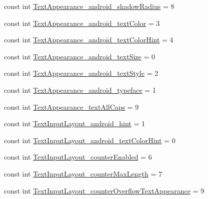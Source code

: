 \begin{DoxyCompactItemize}
\item 
const int \mbox{\hyperlink{class_f_w_p_s___app_1_1_droid_1_1_resource_1_1_styleable_a6eca0cdcb2ebbda7ddcb47d769a078ae}{Text\+Appearance\+\_\+android\+\_\+shadow\+Radius}} = 8
\item 
const int \mbox{\hyperlink{class_f_w_p_s___app_1_1_droid_1_1_resource_1_1_styleable_affa6110a89f22db25450a33b43e449c5}{Text\+Appearance\+\_\+android\+\_\+text\+Color}} = 3
\item 
const int \mbox{\hyperlink{class_f_w_p_s___app_1_1_droid_1_1_resource_1_1_styleable_a455c2774be201649151135eaf57e6512}{Text\+Appearance\+\_\+android\+\_\+text\+Color\+Hint}} = 4
\item 
const int \mbox{\hyperlink{class_f_w_p_s___app_1_1_droid_1_1_resource_1_1_styleable_a661917c7b891af0339e4fd7a79ac2b54}{Text\+Appearance\+\_\+android\+\_\+text\+Size}} = 0
\item 
const int \mbox{\hyperlink{class_f_w_p_s___app_1_1_droid_1_1_resource_1_1_styleable_a38d1187b68e0a8e31b5b86de4b38795e}{Text\+Appearance\+\_\+android\+\_\+text\+Style}} = 2
\item 
const int \mbox{\hyperlink{class_f_w_p_s___app_1_1_droid_1_1_resource_1_1_styleable_abc6de3605efd88c1e7126aa93b071d01}{Text\+Appearance\+\_\+android\+\_\+typeface}} = 1
\item 
const int \mbox{\hyperlink{class_f_w_p_s___app_1_1_droid_1_1_resource_1_1_styleable_a51be362d425b1ee66305776ade8edbcf}{Text\+Appearance\+\_\+text\+All\+Caps}} = 9
\item 
const int \mbox{\hyperlink{class_f_w_p_s___app_1_1_droid_1_1_resource_1_1_styleable_a9300e1f8bb3e1bc7079c9b9ad20a0b3a}{Text\+Input\+Layout\+\_\+android\+\_\+hint}} = 1
\item 
const int \mbox{\hyperlink{class_f_w_p_s___app_1_1_droid_1_1_resource_1_1_styleable_a0685c38c6a7027f29548b5302b61a371}{Text\+Input\+Layout\+\_\+android\+\_\+text\+Color\+Hint}} = 0
\item 
const int \mbox{\hyperlink{class_f_w_p_s___app_1_1_droid_1_1_resource_1_1_styleable_acddae507c611dd5cce1407e32bf3ccfa}{Text\+Input\+Layout\+\_\+counter\+Enabled}} = 6
\item 
const int \mbox{\hyperlink{class_f_w_p_s___app_1_1_droid_1_1_resource_1_1_styleable_aee954575a91728f5a5b01c589cea6974}{Text\+Input\+Layout\+\_\+counter\+Max\+Length}} = 7
\item 
const int \mbox{\hyperlink{class_f_w_p_s___app_1_1_droid_1_1_resource_1_1_styleable_aaab45eaab0c9eb5a0f055a8f81714dbe}{Text\+Input\+Layout\+\_\+counter\+Overflow\+Text\+Appearance}} = 9

\end{DoxyCompactItemize}
